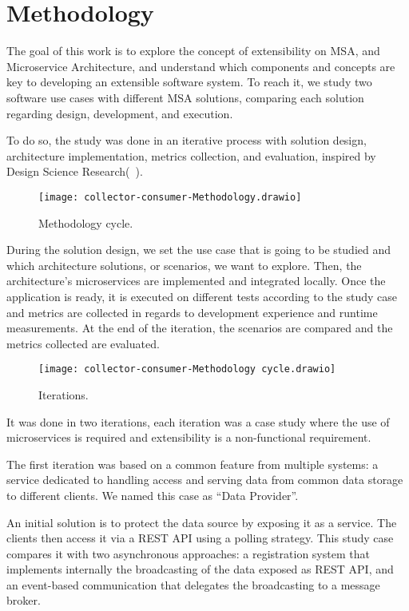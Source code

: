\chapter{Methodology}

The goal of this work is to explore the concept of extensibility on MSA, and Microservice Architecture, and understand which components and concepts are key to developing an extensible software system. To reach it, we study two software use cases with different MSA solutions, comparing each solution regarding design, development, and execution.

To do so, the study was done in an iterative process with solution design, architecture implementation, metrics collection, and evaluation, inspired by Design Science Research(~\cite{DesignParad}).

\begin{figure}
    \centering
    \texttt{[image: collector-consumer-Methodology.drawio]}
    \caption{Methodology cycle.\label{fig:subfigures1}}
\end{figure}

During the solution design, we set the use case that is going to be studied and which architecture solutions, or scenarios, we want to explore. Then, the architecture's microservices are implemented and integrated locally. Once the application is ready, it is executed on different tests according to the study case and metrics are collected in regards to development experience and runtime measurements. At the end of the iteration, the scenarios are compared and the metrics collected are evaluated.

\begin{figure}
    \centering
    \texttt{[image: collector-consumer-Methodology cycle.drawio]}
    \caption{Iterations.\label{fig:subfigures2}}
\end{figure}

It was done in two iterations, each iteration was a case study where the use of microservices is required and extensibility is a non-functional requirement.

The first iteration was based on a common feature from multiple systems: a service dedicated to handling access and serving data from common data storage to different clients. We named this case as “Data Provider”.

An initial solution is to protect the data source by exposing it as a service. The clients then access it via a REST API using a polling strategy. This study case compares it with two asynchronous approaches: a registration system that implements internally the broadcasting of the data exposed as REST API, and an event-based communication that delegates the broadcasting to a message broker.

